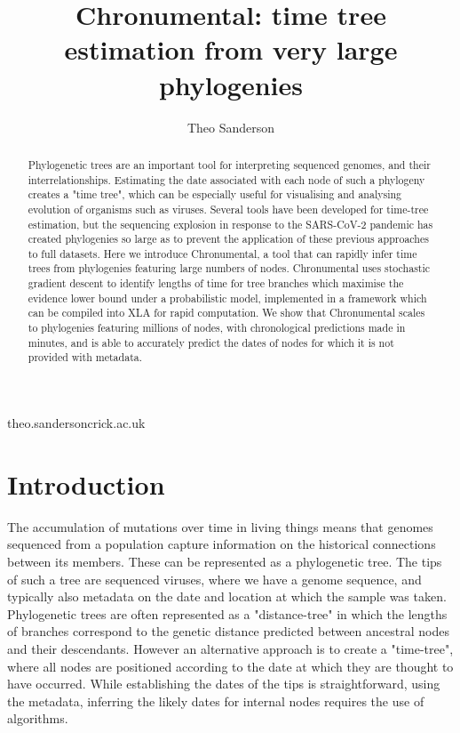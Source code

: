 
\title{Chronumental: time tree estimation from very large phylogenies}

\author[1,2]{Theo Sanderson}

\date{}

\maketitle

\begin{abstract}
Phylogenetic trees are an important tool for interpreting sequenced genomes, and their interrelationships. Estimating the date associated with each node of such a phylogeny creates a "time tree", which can be especially useful for visualising and analysing evolution of organisms such as viruses. Several tools have been developed for time-tree estimation, but the sequencing explosion in response to the SARS-CoV-2 pandemic has created phylogenies so large as to prevent the application of these previous approaches to full datasets. Here we introduce Chronumental, a tool that can rapidly infer time trees from phylogenies featuring large numbers of nodes. Chronumental uses stochastic gradient descent to identify lengths of time for tree branches which maximise the evidence lower bound under a probabilistic model, implemented in a framework which can be compiled into XLA for rapid computation. We show that Chronumental scales to phylogenies featuring millions of nodes, with chronological predictions made in minutes, and is able to accurately predict the dates of nodes for which it is not provided with metadata.
\end{abstract}

\begin{corrauthor}
theo.sanderson\at crick.ac.uk
\end{corrauthor}



\section*{Introduction}\label{s:introduction}
The accumulation of mutations over time in living things means that genomes sequenced from a population capture information on the historical connections between its members. These can be represented as a phylogenetic tree. The tips of such a tree are sequenced viruses, where we have a genome sequence, and typically also metadata on the date and location at which the sample was taken. Phylogenetic trees are often represented as a "distance-tree" in which the lengths of branches correspond to the genetic distance predicted between ancestral nodes and their descendants. However an alternative approach is to create a "time-tree", where all nodes are positioned according to the date at which they are thought to have occurred. While establishing the dates of the tips is straightforward, using the metadata, inferring the likely dates for internal nodes requires the use of algorithms.



